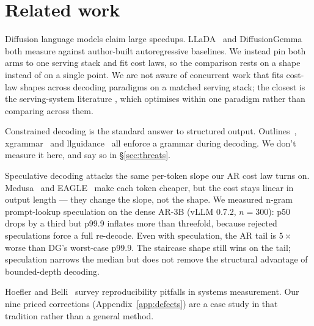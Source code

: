 \section{Related work}
\label{sec:related}

Diffusion language models claim large speedups. LLaDA~\cite{llada2025}
and DiffusionGemma~\cite{diffusiongemma} both measure against
author-built autoregressive baselines. We instead pin both arms to one
serving stack and fit cost laws, so the comparison rests on a shape
instead of on a single point. We are not aware of concurrent work that
fits cost-law shapes across decoding paradigms on a matched serving
stack; the closest is the serving-system literature
\cite{vllm2023}, which optimises within one paradigm rather than
comparing across them.

Constrained decoding is the standard answer to structured
output. Outlines~\cite{outlines2024}, xgrammar~\cite{xgrammar2024} and
llguidance~\cite{llguidance} all enforce a grammar during decoding. We
don't measure it here, and say so in \S\ref{sec:threats}.

Speculative decoding attacks the same per-token slope our AR cost law
turns on. Medusa~\cite{medusa2024} and EAGLE~\cite{eagle2024} make each
token cheaper, but the cost stays linear in output length --- they
change the slope, not the shape. We measured n-gram prompt-lookup
speculation on the dense AR-3B (vLLM 0.7.2, $n{=}300$):
p50 drops by a third but p99.9 inflates more than threefold,
because rejected speculations force a full re-decode. Even with
speculation, the AR tail is $5\times$ worse than DG's worst-case p99.9.
The staircase shape still wins on the tail; speculation narrows the median
but does not remove the structural advantage of bounded-depth decoding.

Hoefler and Belli~\cite{hoefler2021} survey reproducibility pitfalls in
systems measurement. Our nine priced corrections
(Appendix~\ref{app:defects}) are a case study in that tradition rather
than a general method.

